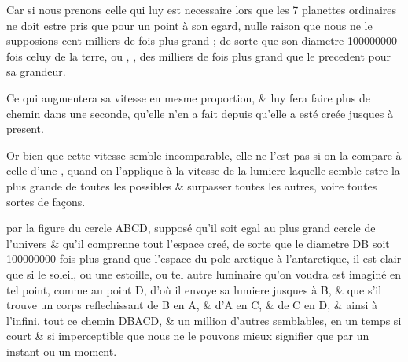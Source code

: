 \documentclass[11pt,a4paper]{article}
\begin{document}

Car si nous prenons celle qui luy est necessaire lors que  les 7 planettes ordinaires ne doit estre pris que pour un point à son egard, nulle raison  que nous ne le supposions cent milliers de fois plus grand ; de sorte que son diametre  100000000 fois celuy de la terre, ou , ,  des milliers de fois plus grand que le precedent pour \ill{} sa grandeur.

Ce qui augmentera sa vitesse en mesme proportion, \& luy fera faire plus de chemin dans une seconde, qu'elle n'en a fait depuis qu'elle a esté creée jusques à present.

Or bien que cette vitesse semble incomparable, elle ne l'est pas si on la compare à celle d'une \ill{}, quand on l'applique à la vitesse de la lumiere laquelle semble estre la plus grande de toutes les possibles \& surpasser toutes les autres, voire  \struck{\ill{}}  toutes sortes de façons.

 par la figure du cercle ABCD, \struck{\ill{}} supposé qu'il soit egal au plus grand cercle de l'univers \& qu'il comprenne tout l'espace creé, de sorte que le diametre DB soit  100000000 fois  plus grand que l'espace \struck{\ill{}} du pole arctique à l'antarctique, il est clair que si le soleil, ou une estoille, ou tel autre luminaire qu'on voudra est imaginé en tel point, comme au point D, d'où il envoye sa lumiere jusques à B, \& que s'il trouve \struck{\ill{}} un corps reflechissant de B en A, \& d'A en C, \& de C en D, \& ainsi à l'infini,  tout ce chemin DBACD, \& un million d'autres semblables, en un temps si court \& si imperceptible que nous ne le pouvons mieux signifier que par un instant ou un moment.
\end{document}
